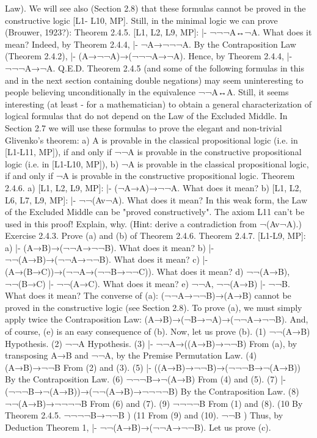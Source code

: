 Law). We will see also (Section 2.8) that these formulas cannot be proved in the constructive logic [L1-
L10, MP].
Still, in the minimal logic we can prove (Brouwer, 1923?):
Theorem 2.4.5. [L1, L2, L9, MP]: |- ¬¬¬A↔¬A. What does it mean?
Indeed, by Theorem 2.4.4, |- ¬A→¬¬¬A. By the Contraposition Law (Theorem 2.4.2), |-
(A→¬¬A)→(¬¬¬A→¬A). Hence, by Theorem 2.4.4, |- ¬¬¬A→¬A. Q.E.D.
Theorem 2.4.5 (and some of the following formulas in this and in the next section containing double
negations) may seem uninteresting to people believing unconditionally in the equivalence ¬¬A↔A. Still,
it seems interesting (at least - for a mathematician) to obtain a general characterization of logical formulas
that do not depend on the Law of the Excluded Middle. In Section 2.7 we will use these formulas to prove
the elegant and non-trivial Glivenko's theorem: a) A is provable in the classical propositional logic (i.e. in
[L1-L11, MP]), if and only if ¬¬A is provable in the constructive propositional logic (i.e. in [L1-L10,
MP]), b) ¬A is provable in the classical propositional logic, if and only if ¬A is provable in the
constructive propositional logic.
Theorem 2.4.6. a) [L1, L2, L9, MP]: |- (¬A→A)→¬¬A. What does it mean?
b) [L1, L2, L6, L7, L9, MP]: |- ¬¬(Av¬A). What does it mean? In this weak form, the Law of the Excluded
Middle can be "proved constructively". The axiom L11 can't be used in this proof! Explain, why. (Hint:
derive a contradiction from ¬(Av¬A).)
Exercise 2.4.3. Prove (a) and (b) of Theorem 2.4.6.
Theorem 2.4.7. [L1-L9, MP]: a) |- (A→B)→(¬¬A→¬¬B). What does it mean?
b) |- ¬¬(A→B)→(¬¬A→¬¬B). What does it mean?
c) |- (A→(B→C))→(¬¬A→(¬¬B→¬¬C)). What does it mean?
d) ¬¬(A→B), ¬¬(B→C) |- ¬¬(A→C). What does it mean?
e) ¬¬A, ¬¬(A→B) |- ¬¬B. What does it mean?
The converse of (a): (¬¬A→¬¬B)→(A→B) cannot be proved in the constructive logic (see Section 2.8).
To prove (a), we must simply apply twice the Contraposition Law: (A→B)→(¬B→¬A)→(¬¬A→¬¬B).
And, of course, (e) is an easy consequence of (b).
Now, let us prove (b).
(1) ¬¬(A→B) Hypothesis.
(2) ¬¬A Hypothesis.
(3) |- ¬¬A→((A→B)→¬¬B) From (a), by transposing A→B and
                                  ¬¬A, by the Premise Permutation Law.
(4) (A→B)→¬¬B From (2) and (3).
(5) |- ((A→B)→¬¬B)→(¬¬¬B→¬(A→B)) By the Contraposition Law.
(6) ¬¬¬B→¬(A→B) From (4) and (5).
(7) |- (¬¬¬B→¬(A→B))→(¬¬(A→B)→¬¬¬¬B) By the Contraposition Law.
(8) ¬¬(A→B)→¬¬¬¬B From (6) and (7).
(9) ¬¬¬¬B From (1) and (8).
(10 By Theorem 2.4.5.
¬¬¬¬B→¬¬B 
        ) 
(11 From (9) and (10).
¬¬B 
  ) 
Thus, by Deduction Theorem 1, |- ¬¬(A→B)→(¬¬A→¬¬B).
Let us prove (c).
